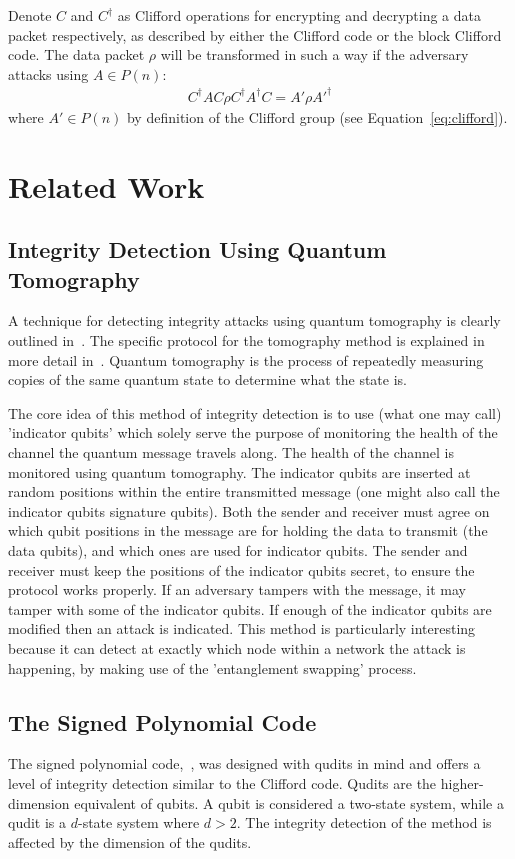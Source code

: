 Denote $C$ and $C^{\dagger}$ as Clifford operations for encrypting and decrypting a data packet respectively, as described by either the Clifford code or the block Clifford code. The data packet $\rho$ will be transformed in such a way if the adversary attacks using $A \in P(n)$: 
\begin{align}
C^{\dagger}AC \rho C^{\dagger}A^{\dagger}C = A' \rho A'^{\dagger}
\end{align}
where $A' \in P(n)$ by definition of the Clifford group (see Equation~\eqref{eq:clifford}).

\chapter{Related Work}
\label{sec:relatedWork}
\section{Integrity Detection Using Quantum Tomography}
\label{subsec:IntegrityDetectionUsingQuantumTomography}
A technique for detecting integrity attacks using quantum tomography is clearly outlined in~\cite{satoh2018network}. The specific protocol for the tomography method is explained in more detail in~\cite{oka2016classical}. Quantum tomography is the process of repeatedly measuring copies of the same quantum state to determine what the state is.

The core idea of this method of integrity detection is to use (what one may call) 'indicator qubits' which solely serve the purpose of monitoring the health of the channel the quantum message travels along. The health of the channel is monitored using quantum tomography. The indicator qubits are inserted at random positions within the entire transmitted message (one might also call the indicator qubits signature qubits). Both the sender and receiver must agree on which qubit positions in the message are for holding the data to transmit (the data qubits), and which ones are used for indicator qubits. The sender and receiver must keep the positions of the indicator qubits secret, to ensure the protocol works properly. If an adversary tampers with the message, it may tamper with some of the indicator qubits. If enough of the indicator qubits are modified then an attack is indicated. This method is particularly interesting because it can detect at exactly which node within a network the attack is happening, by making use of the 'entanglement swapping' process.
\section{The Signed Polynomial Code}
\label{section:signedPolynomialCode}
The signed polynomial code,~\cite{ben2006secure,aharonov2017interactive}, was designed with qudits in mind and offers a level of integrity detection similar to the Clifford code. Qudits are the higher-dimension equivalent of qubits. A qubit is considered a two-state system, while a qudit is a $d$-state system where $d > 2$. The integrity detection of the method is affected by the dimension of the qudits.

